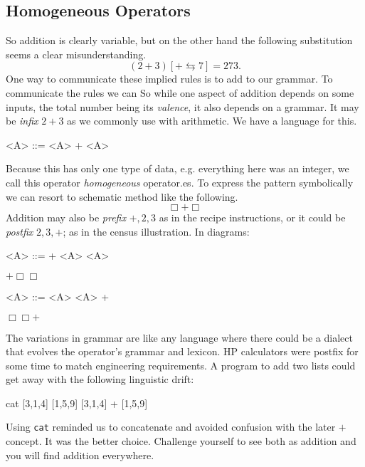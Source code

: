 \subsection{Homogeneous Operators}
So addition is clearly variable, but on the other hand the following substitution 
seems a clear misunderstanding.
\[
    (2+3)[+\leftrightarrows 7]=273.
\]
One way to communicate these implied rules is to add to our grammar.
To communicate the rules we can 
So while one aspect of addition depends on some inputs, the total 
number being its \emph{valence}, it also depends on a grammar.
It may be \emph{infix} $2+3$ as we commonly 
use with arithmetic.  We have a language for this.
\begin{center}
    \begin{minipage}{0.4\textwidth}
\begin{Gcode}[]
<A> ::= <A> + <A> 
\end{Gcode}
\end{minipage}
\end{center}
Because this has only one type of data, e.g. everything here was an integer, 
 we call this operator \emph{homogeneous} operator.es.
To express the pattern symbolically we can resort 
to schematic method like the following.
\[
    \Box+\Box
\]
Addition may also be \emph{prefix} $+,2,3$ as in the recipe instructions,
or it could be \emph{postfix} $2,3,+$; as in the census illustration. 
In diagrams:
\begin{center}
\begin{minipage}{0.4\textwidth}
\centering
\begin{Gcode}[]
<A> ::= + <A> <A> 
\end{Gcode}
$+ \Box \Box$
\hspace{1in}
\end{minipage}
\hfill
\begin{minipage}{0.4\textwidth}
\centering
\begin{Gcode}[]
<A> ::= <A> <A> +
\end{Gcode}
$\Box \Box +$
\end{minipage}    
\end{center}    

The variations in grammar are like any language 
where there could be a dialect that evolves the operator's grammar and lexicon.
 HP calculators were postfix for some time to match engineering requirements.
A program to add two lists could get away with the following linguistic drift:
\begin{center}
\begin{notebookin}
cat [3,1,4] [1,5,9]
[3,1,4] + [1,5,9]
\end{notebookin}
\begin{notebookout}[2]
[3,1,4,1,5,9]
[4,6,13]
\end{notebookout}
\end{center}
Using \texttt{cat} reminded us to concatenate and avoided confusion with the
later $+$ concept.  It was the better choice. Challenge yourself to see both as
addition and you will find addition everywhere. 

